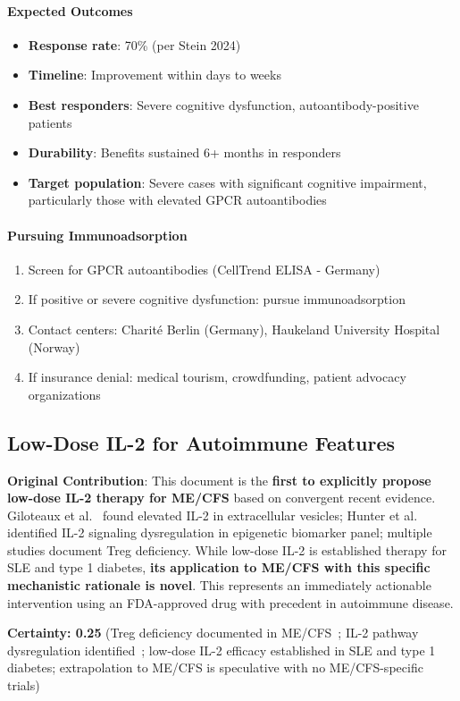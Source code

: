 \paragraph{Expected Outcomes}
\begin{itemize}
    \item \textbf{Response rate}: 70\% (per Stein 2024)
    \item \textbf{Timeline}: Improvement within days to weeks
    \item \textbf{Best responders}: Severe cognitive dysfunction, autoantibody-positive patients
    \item \textbf{Durability}: Benefits sustained 6+ months in responders
    \item \textbf{Target population}: Severe cases with significant cognitive impairment, particularly those with elevated GPCR autoantibodies
\end{itemize}

\paragraph{Pursuing Immunoadsorption}
\begin{enumerate}
    \item Screen for GPCR autoantibodies (CellTrend ELISA - Germany)
    \item If positive or severe cognitive dysfunction: pursue immunoadsorption
    \item Contact centers: Charité Berlin (Germany), Haukeland University Hospital (Norway)
    \item If insurance denial: medical tourism, crowdfunding, patient advocacy organizations
\end{enumerate}

\subsection{Low-Dose IL-2 for Autoimmune Features}
\label{sec:low-dose-il2}

\begin{speculation}
\label{spec:low-dose-il2-mecfs}
\textbf{Original Contribution}: This document is the \textbf{first to explicitly propose low-dose IL-2 therapy for ME/CFS} based on convergent recent evidence. Giloteaux et al.~\cite{Giloteaux2023} found elevated IL-2 in extracellular vesicles; Hunter et al.~\cite{Hunter2025} identified IL-2 signaling dysregulation in epigenetic biomarker panel; multiple studies document Treg deficiency. While low-dose IL-2 is established therapy for SLE and type 1 diabetes, \textbf{its application to ME/CFS with this specific mechanistic rationale is novel}. This represents an immediately actionable intervention using an FDA-approved drug with precedent in autoimmune disease.

\textbf{Certainty: 0.25} (Treg deficiency documented in ME/CFS~\cite{Che2025}; IL-2 pathway dysregulation identified~\cite{Hunter2025,Giloteaux2023}; low-dose IL-2 efficacy established in SLE and type 1 diabetes; extrapolation to ME/CFS is speculative with no ME/CFS-specific trials)
\end{speculation}

